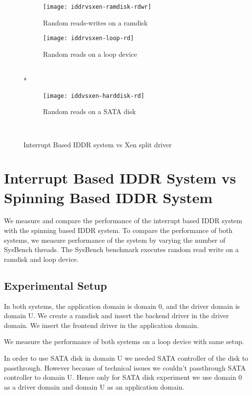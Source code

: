 \begin{figure}[!ht]
  \begin{subfigure}[b]{0.2\textwidth}
  \texttt{[image: iddrvsxen-ramdisk-rdwr]}
  \caption{Random reads-writes on a ramdisk}
  \label{fig:iddrvsxen-ramdisk-rdwr}
  \end{subfigure}
  \hspace{50mm}
  \begin{subfigure}[b]{0.2\textwidth}
  \texttt{[image: iddrvsxen-loop-rd]}
  \caption{Random reads on a loop device}
  \label{fig:iddrvsxen-loop-rd}
  \end{subfigure}\\*
  \hspace{150mm}
  \begin{subfigure}[b]{0.2\textwidth}
  \texttt{[image: iddvsxen-harddisk-rd]}
  \caption{Random reads on a SATA disk}
  \label{fig:iddrvsxen-harddisk-rd}
  \end{subfigure}\\

\caption{Interrupt Based IDDR system vs Xen split driver}\label{fig:seqloopdisk}
\end{figure}

%
%
\section{Interrupt Based IDDR System vs Spinning Based IDDR System}
We measure and compare the performance of the interrupt based IDDR system
with the spinning based IDDR system. To compare the performance of both
systems, we measure performance of the system by varying the number of
SysBench threads. The SysBench benchmark executes random read write on
a ramdisk and loop device.

\subsection*{Experimental Setup}
In both systems, the application domain is domain 0, and the driver domain
is domain U. We create a ramdisk and insert the backend driver in the
driver domain. We insert the frontend driver in the application domain.

We measure the performance of both systems on a loop device with same setup.

In order to use SATA disk in domain U we needed SATA controller of the
disk to passthrough. However because of technical issues we couldn't
passthrough SATA controller to domain U. Hence only for SATA disk
experiment we use domain 0 as a driver domain and domain U as an
application domain.

